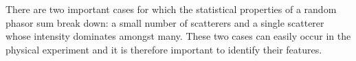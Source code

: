 There are two important cases for which the statistical properties of a random
phasor sum break down: a small number of scatterers and a single scatterer
whose intensity dominates amongst many.  These two cases can easily occur in
the physical experiment and it is therefore important to identify their
features.
